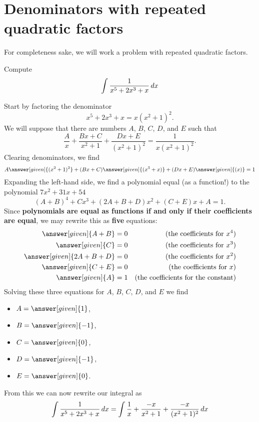 \documentclass{ximera}
\begin{document}
\section{Denominators with repeated quadratic factors}

For completeness sake, we will work a problem with repeated quadratic factors.

\begin{example}
  Compute
  \[
  \int \frac{1}{x^5 + 2x^3  + x}\mathop{}\!d x
  \]
  \begin{explanation}
    Start by factoring the denominator
    \[
    x^5 + 2x^3  + x = x(x^2+1)^2.
    \]
    We will suppose that there are numbers $A$, $B$, $C$, $D$, and $E$
    such that
    \[
    \frac{A}{x} + \frac{Bx+C}{x^2+1} + \frac{Dx+E}{(x^2+1)^2} = \frac{1}{x(x^2+1)^2}.
    \]
    Clearing denominators, we find
    \[
    A\answer[given]{(x^2+1)^2} + (Bx+C)\answer[given]{(x^3+x)}+ (Dx+E)\answer[given]{(x)} = 1
    \]
    Expanding the left-hand side, we find a polynomial equal (as a
    function!) to the polynomial $7x^2+31x+54$
    \[
    (A+B)^4 +  Cx^3 + (2A+B+D)x^2 + (C+E)x + A = 1.
    \]
    Since \textbf{polynomials are equal as functions if and only if
      their coefficients are equal}, we may rewrite this as
    \textbf{five} equations:
    \begin{align*}
      \answer[given]{A+B} &= 0 &\text{(the coefficients for $x^4$)}\\
      \answer[given]{C} &= 0 &\text{(the coefficients for $x^3$)}\\
      \answer[given]{2A+B+D} &= 0 &\text{(the coefficients for $x^2$)}\\
      \answer[given]{C+E} &= 0 &\text{(the coefficients for $x$)}\\
      \answer[given]{A} &= 1 &\text{(the coefficients for the constant)}
    \end{align*}
    Solving these three equations for $A$, $B$, $C$, $D$, and $E$ we find
    \begin{itemize}
    \item $A = \answer[given]{1}$,
    \item $B = \answer[given]{-1}$,
    \item $C = \answer[given]{0}$,
    \item $D = \answer[given]{-1}$,
    \item $E = \answer[given]{0}$.
    \end{itemize}
    From this we can now rewrite our integral as
    \[
    \int \frac{1}{x^5 + 2x^3  + x}\mathop{}\!d x =\int \frac{1}{x} + \frac{-x}{x^2+1} + \frac{-x}{(x^2+1)^2}\mathop{}\!d x
\]
\end{explanation}
\end{example}
\end{document}
